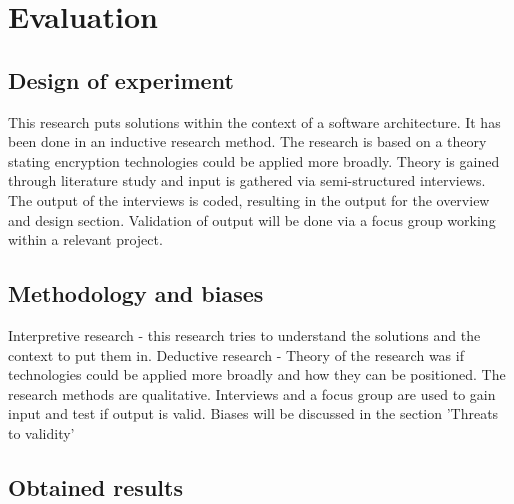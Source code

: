 \chapter{Evaluation}\label{s:evaluation}

\section{Design of experiment}
This research puts solutions within the context of a software architecture. It has been done in an inductive research method. The research is based on a theory stating encryption technologies
could be applied more broadly. Theory is gained through literature study and input is gathered via semi-structured interviews. The output of the interviews is coded, resulting in the output for the overview and design section. Validation of output will be done via a focus group working within a relevant project.

\section{Methodology and biases}
Interpretive research - this research tries to understand the solutions and the context to put them in. 
Deductive research - Theory of the research was if technologies could be applied more broadly and how they can be positioned.
The research methods are qualitative. Interviews and a focus group are used to gain input and test if output is valid. Biases will be discussed in the section 'Threats to validity'

\section{Obtained results}
\lipsum[1-1]





